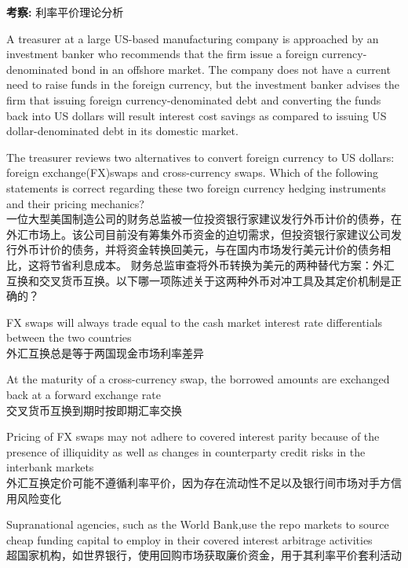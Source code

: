 \documentclass{article}
\newcounter{question} %
\newcommand{\checklist}[1]{
    \textbf{考察:} #1 \par %
    \addcontentsline{toc}{subsection}{题号\thequestion 考察: #1} %
    \vspace{2em} %
}
\begin{document}
\checklist{利率平价理论分析}



\begin{question}
    A treasurer at a large US-based manufacturing company is approached by an investment banker who recommends that the firm issue a foreign currency-denominated bond in an offshore market. The company does not have a current need to raise funds in the foreign currency, but the investment banker advises the firm that issuing foreign currency-denominated debt and converting the funds back into US dollars will result interest cost savings as compared to issuing US dollar-denominated debt in its domestic market.

    The treasurer reviews two alternatives to convert foreign currency to US dollars: foreign exchange(FX)swaps and cross-currency swaps. Which of the following statements is correct regarding these two foreign currency hedging instruments and their pricing mechanics?
    \\ 一位大型美国制造公司的财务总监被一位投资银行家建议发行外币计价的债券，在外汇市场上。该公司目前没有筹集外币资金的迫切需求，但投资银行家建议公司发行外币计价的债务，并将资金转换回美元，与在国内市场发行美元计价的债务相比，这将节省利息成本。
    财务总监审查将外币转换为美元的两种替代方案：外汇互换和交叉货币互换。以下哪一项陈述关于这两种外币对冲工具及其定价机制是正确的？
\end{question}

\begin{choices}
    \item FX swaps will always trade equal to the cash market interest rate differentials between the two countries\\
    外汇互换总是等于两国现金市场利率差异
    \item At the maturity of a cross-currency swap, the borrowed amounts are exchanged back at a forward exchange rate\\
    交叉货币互换到期时按即期汇率交换
    \item Pricing of FX swaps may not adhere to covered interest parity because of the presence of illiquidity as well as changes in counterparty credit risks in the interbank markets\\
    外汇互换定价可能不遵循利率平价，因为存在流动性不足以及银行间市场对手方信用风险变化
    \item Supranational agencies, such as the World Bank,use the repo markets to source cheap funding capital to employ in their covered interest arbitrage activities\\
    超国家机构，如世界银行，使用回购市场获取廉价资金，用于其利率平价套利活动
\end{choices}
\end{document}
